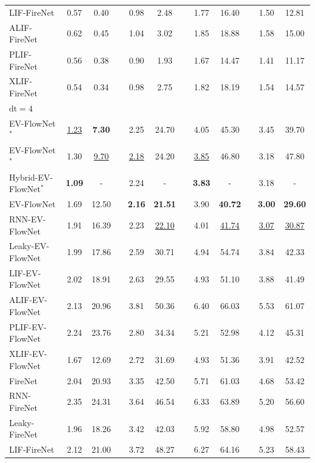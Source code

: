 \begin{table}[!t]
{{\begin{tabular}{lccccccccccc}
				LIF-FireNet & 0.57 & 0.40 && 0.98 & 2.48 && 1.77 & 16.40 && 1.50 & 12.81 \\
				ALIF-FireNet & 0.62 & 0.45 && 1.04 & 3.02 && 1.85 & 18.88 && 1.58 & 15.00 \\
				PLIF-FireNet & 0.56 & 0.38 && 0.90 & 1.93 && 1.67 & 14.47 && 1.41 & 11.17 \\
				XLIF-FireNet & 0.54 & 0.34 && 0.98 & 2.75 && 1.82 & 18.19 && 1.54 & 14.57 \\
				\midrule
				\multirow{2}{*}{${\text{dt}=4}$} & & && & && & && & \\
				& & && & && & && & \\\midrule
				EV-FlowNet$^*$ \cite{zhu2018evflownet}& \underline{1.23} & \textbf{7.30} && 2.25 & 24.70 && 4.05 & 45.30 && 3.45 & 39.70 \\
				EV-FlowNet$^*$ \cite{zhu2019unsupervised}& 1.30 & \underline{9.70} && \underline{2.18} & 24.20 && \underline{3.85} & 46.80 && 3.18 & 47.80 \\
				Hybrid-EV-FlowNet$^*$ \cite{lee2020spikeflownet}& \textbf{1.09} & - && 2.24 & - && \textbf{3.83} & - && 3.18 & - \\\hdashline
				EV-FlowNet & 1.69 & 12.50 && \textbf{2.16} & \textbf{21.51} && 3.90 & \textbf{40.72} && \textbf{3.00} & \textbf{29.60} \\
				RNN-EV-FlowNet & 1.91 & 16.39 && 2.23 & \underline{22.10} && 4.01 & \underline{41.74} && \underline{3.07} & \underline{30.87} \\
				Leaky-EV-FlowNet & 1.99 & 17.86 && 2.59 & 30.71 && 4.94 & 54.74 && 3.84 & 42.33 \\
				LIF-EV-FlowNet & 2.02 & 18.91 && 2.63 & 29.55 && 4.93 & 51.10 && 3.88 & 41.49 \\
				ALIF-EV-FlowNet & 2.13 & 20.96 && 3.81 & 50.36 && 6.40 & 66.03 && 5.53 & 61.07 \\
				PLIF-EV-FlowNet & 2.24 & 23.76 && 2.80 & 34.34 && 5.21 & 52.98 && 4.12 & 45.31 \\
				XLIF-EV-FlowNet & 1.67 & 12.69 && 2.72 & 31.69 && 4.93 & 51.36 && 3.91 & 42.52 \\\hdashline
				FireNet & 2.04 & 20.93 && 3.35 & 42.50 && 5.71 & 61.03 && 4.68 & 53.42 \\
				RNN-FireNet & 2.35 & 24.31 && 3.64 & 46.54 && 6.33 & 63.89 && 5.20 & 56.60 \\
				Leaky-FireNet & 1.96 & 18.26 && 3.42 & 42.03 && 5.92 & 58.80 && 4.98 & 52.57 \\
				LIF-FireNet & 2.12 & 21.00 && 3.72 & 48.27 && 6.27 & 64.16 && 5.23 & 58.43 \\

\end{tabular}}}
\end{table}
